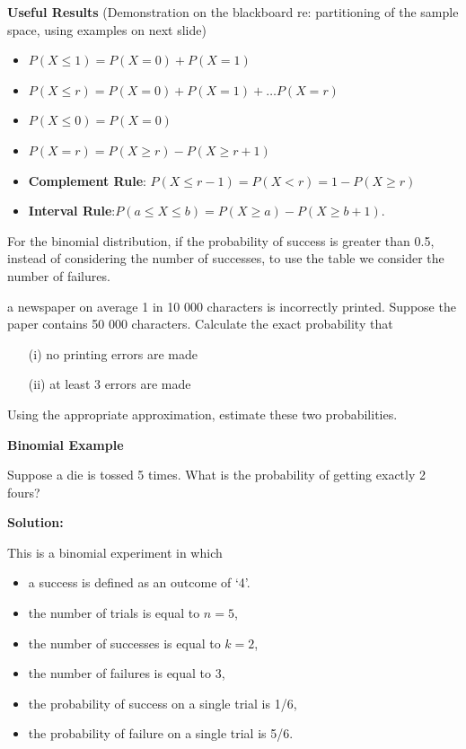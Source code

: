 \documentclass[]{report}
\begin{document}
{\textbf{Useful Results}
(Demonstration on the blackboard re: partitioning of the sample space, using examples on next slide)
\begin{itemize}
\item $P(X \leq 1) = P(X=0) + P(X=1)$
\item $P(X \leq r) = P(X=0)+ P(X=1) + \ldots P(X= r)$
\item $P(X \leq 0) = P(X=0)$
\item $P(X = r) = P(X \geq r ) - P(X \geq r + 1)$
\item \textbf{Complement Rule}: $P(X \leq r-1) = P(X < r) = 1 - P(X \geq r)$
\item \textbf{Interval Rule}:$ P(a \leq X \leq  b)= P(X \geq a) - P(X \geq b + 1).$
\end{itemize}
For the binomial distribution, if the probability of success is greater than 0.5, instead of
considering the number of successes, to use the table we consider
the number of failures.




\itemIn a newspaper on average 1 in 10 000 characters is incorrectly printed. Suppose the paper contains 50 000 characters. Calculate the exact probability that 
\begin{itemize}
\item[(i)]no printing errors are made
\item[(ii)]at least 3 errors are made
\end{itemize}
Using the appropriate approximation, estimate these two probabilities. 

\textbf{Binomial Example }

Suppose a die is tossed 5 times. What is the probability of getting exactly 2 fours?

\textbf{Solution:}

This is a binomial experiment in which \begin{itemize}\item a success is defined as an outcome of `4'. \item the number of trials is equal to $n=5$, \item the number of successes is equal to $k=2$,\item the number of failures is equal to 3, \item  the probability of success on a single trial is 1/6, \item  the probability of failure on a single trial is 5/6.\end{itemize}

}
\end{document}
